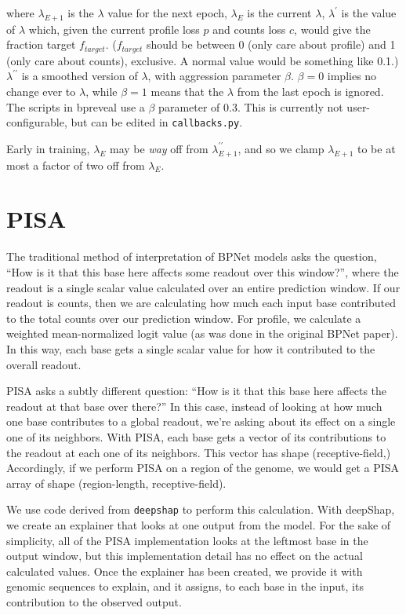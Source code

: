 \documentclass{article}
\begin{document}
where $\lambda_{E+1}$ is the $\lambda$ value for the next epoch, $\lambda_E$
is the current $\lambda$, $\lambda^{\prime}$ is the value of $\lambda$ which,
given the current profile loss $p$ and counts loss $c$, would give the fraction
target $f_{target}$.
($f_{target}$ should be between 0 (only care about profile) and 1 (only care
about counts), exclusive.
A normal value would be something like 0.1.)
$\lambda^{\prime\prime}$ is a smoothed version of $\lambda$, with aggression
parameter $\beta$. $\beta=0$ implies no change ever to $\lambda$, while
$\beta = 1$ means that the $\lambda$ from the last epoch is ignored.
The scripts in bpreveal use a $\beta$ parameter of 0.3. This is currently not
user-configurable, but can be edited in \texttt{callbacks.py}.

Early in training, $\lambda_E$ may be \emph{way} off from
$\lambda^{\prime\prime}_{E+1}$, and so we clamp $\lambda_{E+1}$ to be at most
a factor of two off from $\lambda_E$.

\section{PISA}\label{sec:pisa}
The traditional method of interpretation of BPNet models asks the question,
``How is it that this base here affects some readout over this window?'',
where the readout is a single scalar value calculated over an entire prediction
window.
If our readout is counts, then we are calculating how much each input base
contributed to the total counts over our prediction window.
For profile, we calculate a weighted mean-normalized logit value (as was done in
the original BPNet paper).
In this way, each base gets a single scalar value for how it contributed to the
overall readout.

PISA asks a subtly different question:
``How is it that this base here affects the readout at that base over there?''
In this case, instead of looking at how much one base contributes to a global
readout, we're asking about its effect on a single one of its neighbors.
With PISA, each base gets a vector of its contributions to the readout at each
one of its neighbors.
This vector has shape (receptive-field,)
Accordingly, if we perform PISA on a region of the genome, we would get a PISA
array of shape (region-length, receptive-field).

We use code derived from \texttt{deepshap} to perform this calculation.
With deepShap, we create an explainer that looks at one output from the model.
For the sake of simplicity, all of the PISA implementation looks at the leftmost
base in the output window, but this implementation detail has no effect on the
actual calculated values.
Once the explainer has been created, we provide it with genomic sequences to
explain, and it assigns, to each base in the input, its contribution to the
observed output.
\end{document}
